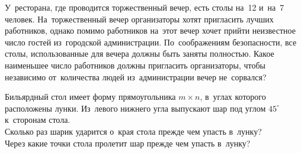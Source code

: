 \begin{problems}
\item
У~ресторана, где проводится торжественный вечер, есть столы на~12
и~на~7 человек.
На~торжественный вечер организаторы хотят пригласить лучших работников, однако
помимо работников на~этот вечер хочет прийти неизвестное число гостей
из~городской администрации.
По~соображениям безопасности, все столы, использованные для вечера должны быть
заняты полностью.
Какое наименьшее число работников должны пригласить организаторы, чтобы
независимо от~количества людей из~администрации вечер не~сорвался?

\item
Бильярдный стол имеет форму прямоугольника $m \times n$, в~углах которого
расположены лунки.
Из~левого нижнего угла выпускают шар под углом $45^\circ$ к~сторонам стола.
\\
\subproblem
Сколько раз шарик ударится о~края стола прежде чем упасть в~лунку?
\\
\subproblem
Через какие точки стола пролетит шар прежде чем упасть в~лунку?

\end{problems}

